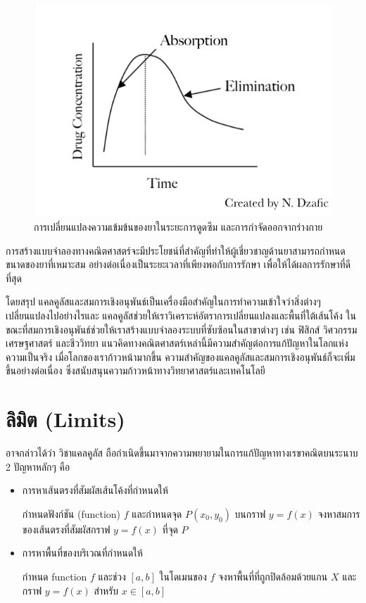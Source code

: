 \documentclass[
]{book}
\begin{document}
\begin{figure}
\includegraphics[width=0.5\linewidth]{images/fig-drub-absorption} \caption{การเปลี่ยนแปลงความเข้มข้นของยาในระยะการดูดซึม และการกำจัดออกจากร่างกาย}\label{fig:fig-drub-absorption}
\end{figure}

การสร้างแบบจำลองทางคณิตศาสตร์จะมีประโยชน์ที่สำคัญที่ทำให้ผู้เชี่ยวชาญด้านยาสามารถกำหนดขนาดของยาที่เหมาะสม
อย่างต่อเนื่องเป็นระยะเวลาที่เพียงพอกับการรักษา เพื่อให้ได้ผลการรักษาที่ดีที่สุด

โดยสรุป แคลคูลัสและสมการเชิงอนุพันธ์เป็นเครื่องมือสำคัญในการทำความเข้าใจว่าสิ่งต่างๆ
เปลี่ยนแปลงไปอย่างไรและ แคลคูลัสช่วยให้เราวิเคราะห์อัตราการเปลี่ยนแปลงและพื้นที่ใต้เส้นโค้ง
ในขณะที่สมการเชิงอนุพันธ์ช่วยให้เราสร้างแบบจำลองระบบที่ซับซ้อนในสาขาต่างๆ เช่น ฟิสิกส์
วิศวกรรม เศรษฐศาสตร์ และชีววิทยา
แนวคิดทางคณิตศาสตร์เหล่านี้มีความสำคัญต่อการแก้ปัญหาในโลกแห่งความเป็นจริง
เมื่อโลกของเราก้าวหน้ามากขึ้น
ความสำคัญของแคลคูลัสและสมการเชิงอนุพันธ์ก็จะเพิ่มขึ้นอย่างต่อเนื่อง
ซึ่งสนับสนุนความก้าวหน้าทางวิทยาศาสตร์และเทคโนโลยี

\chapter{ลิมิต (Limits)}\label{uxe25uxe21uxe15-limits}

อาจกล่าวได้ว่า วิชาแคลคูลัส
ถือกำเนิดขึ้นมาจากความพยายามในการแก้ปัญหาทางเรขาคณิตบนระนาบ 2 ปัญหาหลักๆ คือ

\begin{itemize}
\item
  การหาเส้นตรงที่สัมผัสเส้นโค้งที่กำหนดให้

  กำหนดฟังก์ชัน (function) \(f\) และกำหนดจุด \(P(x_{0},y_{0})\) บนกราฟ
  \(y = f(x)\) จงหาสมการของเส้นตรงที่สัมผัสกราฟ \(y = f(x)\) ที่จุด \(P\)
\item
  การหาพื้นที่ของบริเวณที่กำหนดให้

  กำหนด function \(f\) และช่วง \([a,b]\) ในโดเมนของ \(f\)
  จงหาพื้นที่ที่ถูกปิดล้อมด้วยแกน \(X\) และกราฟ \(y = f(x)\) สำหรับ \(x \in [a,b]\)
\end{itemize}
\end{document}
